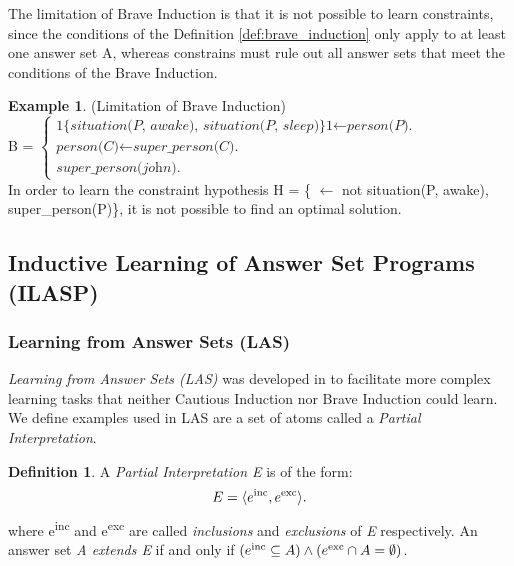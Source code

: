 \documentclass[11pt,twoside]{report}
\theoremstyle{plain}
\theoremstyle{definition}
\newtheorem{defn}[thm]{Definition} %
\newtheorem{examp}{Example}[section]
\begin{document}
The limitation of Brave Induction is that it is not possible to learn constraints, since the conditions of the Definition \ref{def:brave_induction} only apply to at least one answer set A, 
whereas constrains must rule out all answer sets that meet  the conditions of the Brave Induction.

\begin{examp} \normalfont (Limitation of Brave Induction) \\

B = $\begin{cases}
	\textit{1\{situation(P, awake), situation(P, sleep)\}1} \leftarrow \textit{person(P).} \\
	\textit{person(C)} \leftarrow \textit{super\_person(C).} \\
	\textit{super\_person(john).}
	\end{cases}$ \\

In order to learn the  constraint hypothesis H = \{ $\leftarrow$ not situation(P, awake), super\_person(P)\}, it is not possible to find an optimal solution.
\end{examp}
\label{limitation_brave}

\subsection{Inductive Learning of Answer Set Programs (ILASP)}
\label{section_lasp}

\subsubsection{Learning from Answer Sets (LAS)}
\textit{Learning from Answer Sets (LAS)} was developed in \cite{Law2014} to facilitate more complex learning tasks that neither Cautious Induction nor Brave Induction could learn.
We define examples used in LAS are a set of atoms called a \textit{Partial Interpretation}.
\begin{defn}
A \textit{Partial Interpretation E} is of the form:
\begin{equation}
\begin{split}
E = \langle e\textsuperscript{inc}, e\textsuperscript{exc} \rangle. 
\end{split}
\label{partial_interpretations}
\end{equation}
where e\textsuperscript{inc} and e\textsuperscript{exc} are called \textit{inclusions} and \textit{exclusions} of \textit{E} respectively.
An answer set \textit{A extends E} if and only if $(e\textsuperscript{inc} \subseteq A) \wedge (e\textsuperscript{exc} \cap A = \emptyset)$.
\end{defn}
\end{document}
